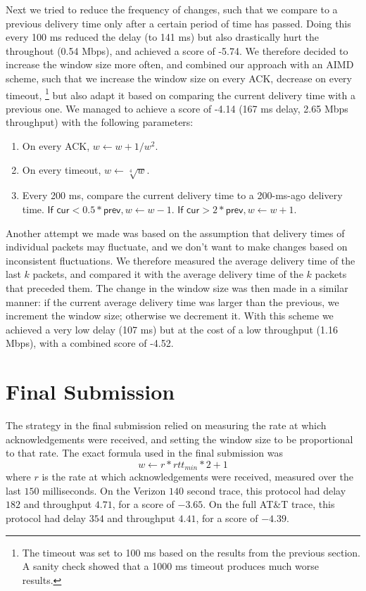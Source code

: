 \documentclass[a4paper,10pt]{article}
\begin{document}
Next we tried to reduce the frequency of changes, such that we compare to a previous 
delivery time only after a certain period of time has passed. Doing this every 100 ms 
reduced the delay (to 141 ms) but also drastically hurt the throughout (0.54 Mbps), 
and achieved a score of -5.74. We therefore decided to increase the window size more 
often, and combined our approach with an AIMD scheme, such that we increase the window 
size on every ACK, decrease on every timeout,
\footnote{The timeout was set to 100 ms based on the results from the previous section. 
A sanity check showed that a 1000 ms timeout produces much worse results.} 
but also adapt it based on comparing the current delivery time with a previous one. 
We managed to achieve a score of -4.14 (167 ms delay, 2.65 Mbps throughput) with the 
following parameters: 

\begin{enumerate}
 \item On every ACK, $ w \leftarrow w + 1/w^2 $.
 \item On every timeout, $ w \leftarrow \sqrt[4]{w} $.
 \item Every 200 ms, compare the current delivery time to a 200-ms-ago delivery time. 
 $ \textsf{If cur} < 0.5 * \textsf{prev}, w \leftarrow w-1$. $ \textsf{If cur} > 2 * 
 \textsf{prev}, w \leftarrow w+1 $. 
\end{enumerate}

Another attempt we made was based on the assumption that delivery times of individual 
packets may fluctuate, and we don't want to make changes based on inconsistent 
fluctuations. We therefore measured the average delivery time of the last $k$ packets,
and compared it with the average delivery time of the $k$ packets that preceded them. 
The change in the window size was then made in a similar manner: if the current average
delivery time was larger than the previous, we increment the window size; otherwise we 
decrement it. With this scheme we achieved a very low delay (107 ms) but at the cost
of a low throughput (1.16 Mbps), with a combined score of -4.52. 


\section{Final Submission}

The strategy in the final submission relied on measuring the rate at which acknowledgements
were received, and setting the window size to be proportional to that rate. The exact formula
used in the final submission was
$$w \leftarrow r * rtt_{min} * 2 + 1$$
where $r$ is the rate at which acknowledgements were received, measured over the last $150$
milliseconds. On the Verizon $140$ second trace, this protocol had delay $182$ and throughput $4.71$,
for a score of $-3.65$. On the full AT\&T trace, this protocol had delay $354$ and throughput $4.41$, for a
score of $-4.39$.
\end{document}
